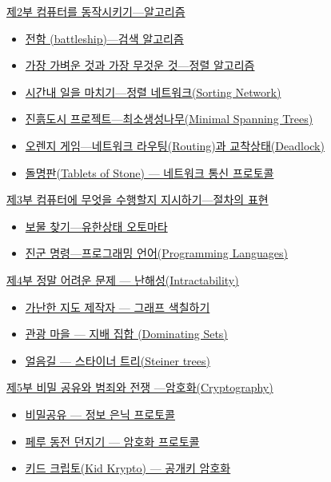 \documentclass[]{article}
\begin{document}
\hyperref[part-ii]{제2부 컴퓨터를 동작시키기---알고리즘}

\begin{itemize}
\itemsep1pt\parskip0pt
\item
  \hyperref[searching-algorithms]{전함 (battleship)---검색 알고리즘}
\item
  \hyperref[sorting-algorithms]{가장 가벼운 것과 가장 무것운 것---정렬
  알고리즘}
\item
  \hyperref[sorting-networks]{시간내 일을 마치기---정렬 네트워크(Sorting
  Network)}
\item
  \hyperref[minimal-spanning-trees]{진흙도시
  프로젝트---최소생성나무(Minimal Spanning Trees)}
\item
  \hyperref[orange-game]{오렌지 게임---네트워크 라우팅(Routing)과
  교착상태(Deadlock)}
\item
  \hyperref[tablets-of-stone]{돌명판(Tablets of Stone) --- 네트워크 통신
  프로토콜}
\end{itemize}

\hyperref[part-iii]{제3부 컴퓨터에 무엇을 수행할지 지시하기---절차의
표현}

\begin{itemize}
\itemsep1pt\parskip0pt
\item
  \hyperref[finite-state-automata]{보물 찾기---유한상태 오토마타}
\item
  \hyperref[marching-orders]{진군 명령---프로그래밍 언어(Programming
  Languages)}
\end{itemize}

\hyperref[part-iv]{제4부 정말 어려운 문제 --- 난해성(Intractability)}

\begin{itemize}
\itemsep1pt\parskip0pt
\item
  \hyperref[graph-coloring]{가난한 지도 제작자 --- 그래프 색칠하기}
\item
  \hyperref[dominating-sets]{관광 마을 --- 지배 집합 (Dominating Sets)}
\item
  \hyperref[steiner-trees]{얼음길 --- 스타이너 트리(Steiner trees)}
\end{itemize}

\hyperref[part-v]{제5부 비밀 공유와 범죄와 전쟁 ---암호화(Cryptography)}

\begin{itemize}
\itemsep1pt\parskip0pt
\item
  \hyperref[information-hiding-protocols]{비밀공유 --- 정보 은닉
  프로토콜}
\item
  \hyperref[cryptographic-protocols]{페루 동전 던지기 --- 암호화
  프로토콜}
\item
  \hyperref[public-key-encryption]{키드 크립토(Kid Krypto) --- 공개키
  암호화}
\end{itemize}
\end{document}

